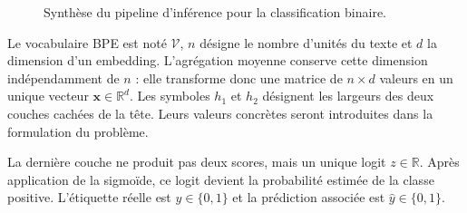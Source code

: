 \begin{figure}[!ht]
{%
    }
    \caption{Synthèse du pipeline d'inférence pour la classification binaire.}
    \label{fig:synthese_pipeline}
\end{figure}

Le vocabulaire BPE est noté $\mathcal{V}$, $n$ désigne le nombre d'unités du
texte et $d$ la dimension d'un embedding. L'agrégation moyenne conserve cette
dimension indépendamment de $n$ : elle transforme donc une matrice de
$n\times d$ valeurs en un unique vecteur $\boldsymbol{x}\in\mathbb{R}^{d}$.
Les symboles $h_1$ et $h_2$ désignent les largeurs des deux couches cachées de
la tête. Leurs valeurs concrètes seront introduites dans la formulation du
problème.

La dernière couche ne produit pas deux scores, mais un unique logit
$z\in\mathbb{R}$. Après application de la sigmoïde, ce logit devient la
probabilité estimée de la classe positive. L'étiquette réelle est
$y\in\{0,1\}$ et la prédiction associée est
$\widehat y\in\{0,1\}$.
